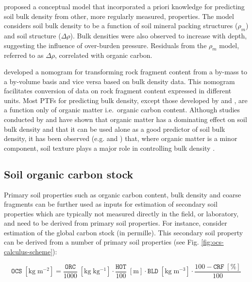 \documentclass[graybox,natbib,nospthms,UStrade]{svmono}
\begin{document}
\citet{Tranter2007SUM} proposed a conceptual model that incorporated a priori
knowledge for predicting soil bulk density from other, more regularly
measured, properties. The model considers soil bulk density to be a
function of soil mineral packing structures (\(\rho_m\)) and soil
structure (\(\Delta \rho\)). Bulk densities were also observed to increase with
depth, suggesting the influence of over-burden pressure. Residuals from
the \(\rho_m\) model, referred to as \(\Delta \rho\), correlated with
organic carbon.

\citet{Torri1994C} developed a nomogram for transforming rock fragment content
from a by-mass to a by-volume basis and vice versa based on bulk density
data. This nomogram facilitates conversion of data on rock fragment
content expressed in different units. Most PTFs for predicting bulk
density, except those developed by \citet{Rawls1983SS} and \citet{Bernoux1998SSSAJ},
are a function only of organic matter i.e.~organic carbon content.
Although studies conducted by \citet{Saini1966N} and \citet{Jeffrey1970JE} have shown
that organic matter has a dominating effect on soil bulk density and
that it can be used alone as a good predictor of soil bulk density, it
has been observed (e.g. \citet{Alexander1980SSSAJ} and \citet{Manrique1991SSSAJ}) that,
where organic matter is a minor component, soil texture plays a major
role in controlling bulk density .

\hypertarget{soil-organic-carbon-stock}{%
\subsection{Soil organic carbon stock}\label{soil-organic-carbon-stock}}

Primary soil properties such as organic carbon content, bulk density and
coarse fragments can be further used as inputs for estimation of secondary soil
properties which are typically not measured directly in the field, or laboratory, and
need to be derived from primary soil properties. For instance, consider
estimation of the global carbon stock (in permille). This secondary soil
property can be derived from a number of primary soil properties
\citep{Nelson1982, sanderman2018soil} (see Fig. \ref{fig:ocs-calculus-scheme}):

\begin{equation}
    \mathtt{OCS} \; [\mathrm{kg \; m^{-2}}] = \frac{{\mathtt{ORC}}}{{1000}} \; [\mathrm{kg \; kg^{-1}}] \cdot \frac{{\mathtt{HOT}}}{{100}} \; [\mathrm{m}] \cdot \mathtt{BLD} \; [\mathrm{kg \; m^{-3}}] \cdot \frac{{100-\mathtt{CRF} \; [\mathrm{\%}]}}{{100}}
\label{eq:ocs-calc}
\end{equation}
\end{document}
